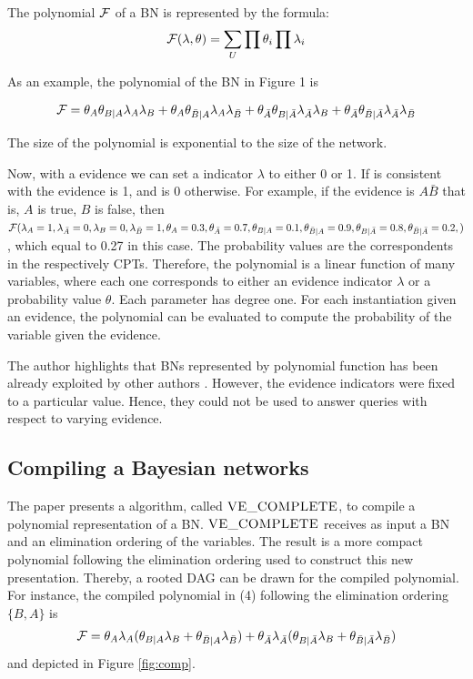 \documentclass[twoside,11pt]{article}
\begin{document}
The polynomial $\cal F$ of a BN is represented by the formula:
\begin{align}
	{\cal F}(\lambda,\theta) = \sum_{U}{\prod{\theta_i}\prod{\lambda_i}}
\end{align}

As an example, the polynomial of the BN in Figure 1 is

\begin{align}
	{\cal F} = \theta_{A}\theta_{B|A}\lambda_{A}\lambda_{B} +
	  \theta_{A}\theta_{\bar{B}|A}\lambda_{A}\lambda_{\bar{B}} +
	 \theta_{\bar{A}}\theta_{B|\bar{A}}\lambda_{\bar{A}}\lambda_{B} +
	  \theta_{\bar{A}}\theta_{\bar{B}|\bar{A}}\lambda_{\bar{A}}\lambda_{\bar{B}}
\end{align}

The size of the polynomial is exponential to the size of the network.

Now, with a evidence we can set a indicator $\lambda$ to either 0 or 1.
If is consistent with the evidence is 1, and is 0 otherwise.
For example, if the evidence is $A\bar{B}$ that is, $A$ is true, $B$ is false, then
	${\cal F}(
	\lambda_{A}=1,
	\lambda_{\bar{A}}=0,
	\lambda_{B}=0,
	\lambda_{\bar{B}}=1,
	\theta_{A} = 0.3,
	\theta_{\bar{A}} = 0.7,
	\theta_{B|A} = 0.1,
	\theta_{\bar{B}|A} = 0.9,
	\theta_{B|\bar{A}} = 0.8,
	\theta_{\bar{B}|\bar{A}} = 0.2,			
	)$,
which equal to 0.27 in this case.
The probability values are the correspondents in the respectively CPTs.
Therefore, the polynomial is a linear function of many variables, where each one corresponds to either an evidence indicator $\lambda$ or a probability value $\theta$.
Each parameter has degree one.
For each instantiation given an evidence, the polynomial can be evaluated to compute the probability of the variable given the evidence.

The author highlights that BNs represented by polynomial function has been already exploited by other authors \citep{castillo1996goal,castillo1997sensitivity,russell1995local}.
However, the evidence indicators were fixed to a particular value.
Hence, they  could not be used to answer queries with respect to varying evidence.


\subsection{Compiling a Bayesian networks}

The paper presents a algorithm, called $\Call{VE\_COMPLETE}{}$, to compile a polynomial representation of a BN. 
$\Call{VE\_COMPLETE}{}$ receives as input a BN and an elimination ordering of the variables.
The result is a more compact polynomial following the elimination ordering used to construct this new presentation.
Thereby, a rooted DAG can be drawn for the compiled polynomial.
For instance, the compiled polynomial in (4) following the elimination ordering $\{B,A\}$ is
\begin{eqnarray}
	{\cal F} = \theta_{A}\lambda_{A}(\theta_{B|A}\lambda_{B} + \theta_{\bar{B}|A}\lambda_{\bar{B}}) + \theta_{\bar{A}}\lambda_{\bar{A}}(\theta_{B|\bar{A}}\lambda_{B}+\theta_{\bar{B}|\bar{A}}\lambda_{\bar{B}})
\end{eqnarray}
and depicted in Figure \ref{fig:comp}.
\end{document}

